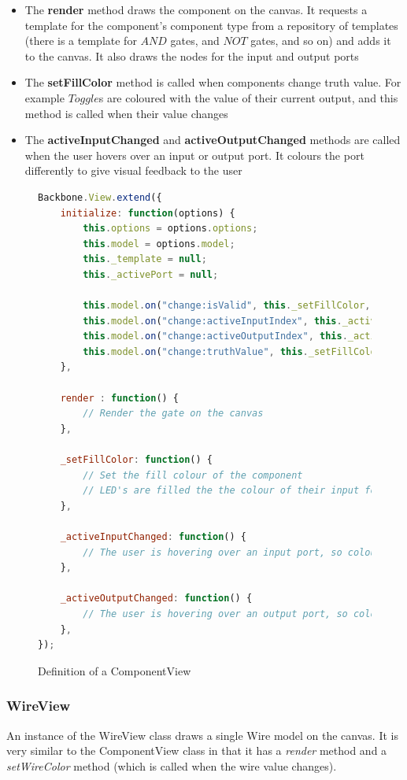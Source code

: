 \begin{itemize}
	\item The \textbf{render} method draws the component on the canvas. It requests a template for the component's component type from a repository of templates (there is a template for $AND$ gates, and $NOT$ gates, and so on) and adds it to the canvas. It also draws the nodes for the input and output ports
	\item The \textbf{setFillColor} method is called when components change truth value. For example $Toggle$s are coloured with the value of their current output, and this method is called when their value changes
	\item The \textbf{activeInputChanged} and \textbf{activeOutputChanged} methods are called when the user hovers over an input or output port. It colours the port differently to give visual feedback to the user
\end{itemize}

\begin{figure}
\begin{lstlisting}[language=JavaScript]
Backbone.View.extend({
    initialize: function(options) {
        this.options = options.options;
        this.model = options.model;
        this._template = null;
        this._activePort = null;

        this.model.on("change:isValid", this._setFillColor, this);
        this.model.on("change:activeInputIndex", this._activeInputChanged, this);
        this.model.on("change:activeOutputIndex", this._activeOutputChanged, this);
        this.model.on("change:truthValue", this._setFillColor, this);
    },

    render : function() {
        // Render the gate on the canvas
    },

    _setFillColor: function() {
        // Set the fill colour of the component
        // LED's are filled the the colour of their input for example
    },

    _activeInputChanged: function() {
        // The user is hovering over an input port, so colour it red
    },

    _activeOutputChanged: function() {
        // The user is hovering over an output port, so colour it red
    },
});
\end{lstlisting}
\caption{Definition of a ComponentView}
\label{fig:componentview}
\end{figure}

\subsubsection{WireView}
An instance of the WireView class draws a single Wire model on the canvas. It is very similar to the ComponentView class in that it has a \textit{render} method and a \textit{setWireColor} method (which is called when the wire value changes).

